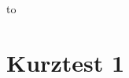 %
%
%



{\parindent0pt\hbox to}
\vspace{0.5cm}

\section*{Kurztest 1}

\begin{uebungsaufgaben}



\end{uebungsaufgaben}


